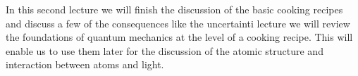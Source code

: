 In this second lecture we will finish the discussion of the basic cooking recipes and discuss a few of the consequences like the uncertainti lecture we will review the foundations of quantum mechanics at the level of a cooking recipe. This will enable us to use them later for the discussion of the atomic structure and interaction between atoms and light.